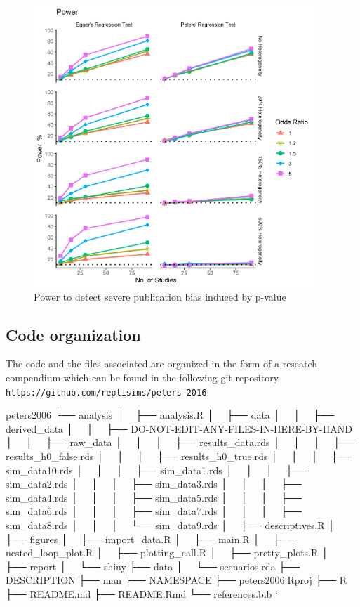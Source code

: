 \documentclass[
  english,
  doc,floatsintext,draftall]{apa6}
\begin{document}
\begin{figure}
\includegraphics[width=300pt]{../figures/power_es_moderate} \caption{Power to detect severe publication bias induced by p-value}\label{fig:unnamed-chunk-5}
\end{figure}

\hypertarget{code-organization}{%
\subsection{Code organization}\label{code-organization}}

The code and the files associated are organized in the form of a reseatch compendium
which can be found in the following git repository \texttt{https://github.com/replisims/peters-2016}

peters2006
├── analysis
│~~ ├── analysis.R
│~~ ├── data
│~~ │~~ ├── derived\_data
│~~ │~~ ├── DO-NOT-EDIT-ANY-FILES-IN-HERE-BY-HAND
│~~ │~~ ├── raw\_data
│~~ │~~ │~~ ├── results\_data.rds
│~~ │~~ │~~ ├── results\_h0\_false.rds
│~~ │~~ │~~ ├── results\_h0\_true.rds
│~~ │~~ │~~ ├── sim\_data10.rds
│~~ │~~ │~~ ├── sim\_data1.rds
│~~ │~~ │~~ ├── sim\_data2.rds
│~~ │~~ │~~ ├── sim\_data3.rds
│~~ │~~ │~~ ├── sim\_data4.rds
│~~ │~~ │~~ ├── sim\_data5.rds
│~~ │~~ │~~ ├── sim\_data6.rds
│~~ │~~ │~~ ├── sim\_data7.rds
│~~ │~~ │~~ ├── sim\_data8.rds
│~~ │~~ │~~ └── sim\_data9.rds
│~~ ├── descriptives.R
│~~ ├── figures
│~~ ├── import\_data.R
│~~ ├── main.R
│~~ ├── nested\_loop\_plot.R
│~~ ├── plotting\_call.R
│~~ ├── pretty\_plots.R
│~~ ├── report
│~~ └── shiny
├── data
│~~ └── scenarios.rda
├── DESCRIPTION
├── man
├── NAMESPACE
├── peters2006.Rproj
├── R
├── README.md
├── README.Rmd
└── references.bib
`
\end{document}
